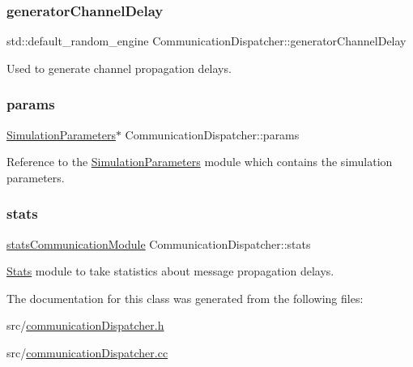 \subsubsection{\texorpdfstring{generator\+Channel\+Delay}{generatorChannelDelay}}
{\footnotesize\ttfamily std\+::default\+\_\+random\+\_\+engine Communication\+Dispatcher\+::generator\+Channel\+Delay\hspace{0.3cm}{\ttfamily [private]}}



Used to generate channel propagation delays. 

\mbox{\label{class_communication_dispatcher_a53751662d1e770a60ddbeea9d4a5d845}} 
\subsubsection{\texorpdfstring{params}{params}}
{\footnotesize\ttfamily \hyperlink{class_simulation_parameters}{Simulation\+Parameters}$\ast$ Communication\+Dispatcher\+::params\hspace{0.3cm}{\ttfamily [private]}}



Reference to the \hyperlink{class_simulation_parameters}{Simulation\+Parameters} module which contains the simulation parameters. 

\mbox{\label{class_communication_dispatcher_a5e01e95460682f3a31417efab24b25e4}} 
\subsubsection{\texorpdfstring{stats}{stats}}
{\footnotesize\ttfamily \hyperlink{communication_dispatcher_8h_a9d0242025c5ba7fecd1b0c41f4777c06}{stats\+Communication\+Module} Communication\+Dispatcher\+::stats\hspace{0.3cm}{\ttfamily [private]}}



\hyperlink{class_stats}{Stats} module to take statistics about message propagation delays. 



The documentation for this class was generated from the following files\+:\begin{DoxyCompactItemize}
\item 
src/\hyperlink{communication_dispatcher_8h}{communication\+Dispatcher.\+h}\item 
src/\hyperlink{communication_dispatcher_8cc}{communication\+Dispatcher.\+cc}\end{DoxyCompactItemize}

